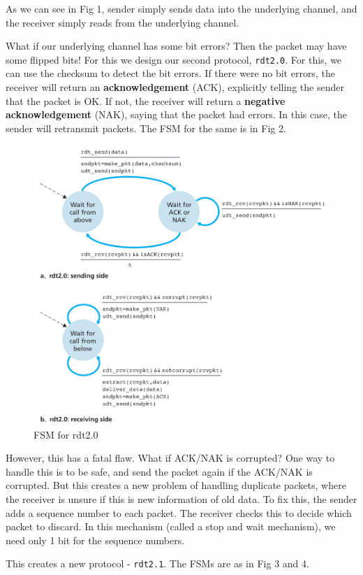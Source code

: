 \documentclass[12pt,letterpaper]{article}
\theoremstyle{definition}
\begin{document}
As we can see in Fig 1, sender simply sends data into the underlying channel, and the receiver simply reads from the underlying channel.

What if our underlying channel has some bit errors? Then the packet may have some flipped bits! For this we design our second protocol, \texttt{rdt2.0}. For this, we can use the checksum to detect the bit errors. If there were no bit errors, the receiver will return an \textbf{acknowledgement} (ACK), explicitly telling the sender that the packet is OK. If not, the receiver will return a \textbf{negative acknowledgement} (NAK), saying that the packet had errors. In this case, the sender will retransmit packets. The FSM for the same is in Fig 2.

\begin{figure}[htpb]
  \centering
  \includegraphics[width=0.8\linewidth]{./assets/rdt2_fsm.png}
  \caption{FSM for rdt2.0}%
  \label{fig:}
\end{figure}

However, this has a fatal flaw. What if ACK/NAK is corrupted? One way to handle this is to be safe, and send the packet again if the ACK/NAK is corrupted. But this creates a new problem of handling duplicate packets, where the receiver is unsure if this is new information of old data. To fix this, the sender adds a sequence number to each packet. The receiver checks this to decide which packet to discard. In this mechanism (called a stop and wait mechanism), we need only 1 bit for the sequence numbers.

This creates a new protocol - \texttt{rdt2.1}. The FSMs are as in Fig 3 and 4.
\end{document}
